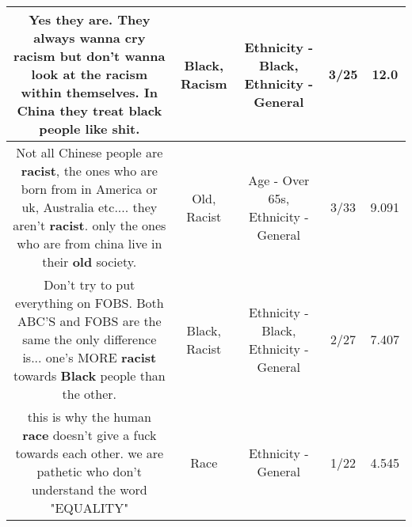 \documentclass[11pt]{article}
\newlength\mylength
\begin{document}
\begin{center}
\begin{longtable}{|C{.65\mylength}|C{.30\mylength}|C{.12\mylength}|C{.12\mylength}|C{.12\mylength}|}
  \small Yes they are. They always wanna cry \textbf{racism} but don't wanna look at the \textbf{racism} within themselves. In China they treat \textbf{black} people like shit.\normalsize   & Black, Racism & Ethnicity - Black, Ethnicity - General & 3/25 & 12.0 \\  \hline
  \small Not all Chinese people are \textbf{racist}, the ones who are born from in America or uk, Australia etc.... they aren't \textbf{racist}. only the ones who are from china live in their \textbf{old} society.\normalsize   & Old, Racist & Age - Over 65s, Ethnicity - General & 3/33 & 9.091 \\  \hline
  \small Don't try to put everything on FOBS. Both ABC'S and FOBS are the same the only difference is... one's MORE \textbf{racist} towards \textbf{Black} people than the other.\normalsize   & Black, Racist & Ethnicity - Black, Ethnicity - General & 2/27 & 7.407 \\  \hline
  \small this is why the human \textbf{race} doesn't give a fuck towards each other. we are pathetic who don't understand the word "EQUALITY"\normalsize   & Race & Ethnicity - General & 1/22 & 4.545 \\  \hline

\end{longtable}
\end{center}
\end{document}
